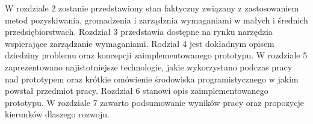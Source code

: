       W rozdziale 2 zostanie przedstawiony stan faktyczny związany z zastosowaniem metod pozyskiwania, gromadzenia i zarządznia wymaganiami w małych i średnich przedsiębiorstwach. Rozdział 3 przedstawia dostępne na rynku narzędzia wspierające zarządzanie wymaganiami. Rodział 4 jest dokładnym opisem dziedziny problemu oraz koncepcji zaimplementowanego prototypu. W rozdziale 5 zaprezentowano najistotniejsze technologie, jakie wykorzystano podczas pracy nad prototypem oraz krótkie omówienie środowiska programistycznego w jakim powstał przedmiot pracy. Rozdział 6 stanowi opis zaimplementowanego prototypu. W rozdziale 7 zawarto podsumowanie wyników pracy oraz propozycje kierunków dlaszego rozwoju. 

